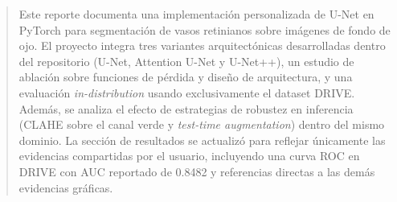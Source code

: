 \begin{abstract}
Este reporte documenta una implementación personalizada de U-Net en PyTorch para segmentación de vasos retinianos sobre imágenes de fondo de ojo. El proyecto integra tres variantes arquitectónicas desarrolladas dentro del repositorio (U-Net, Attention U-Net y U-Net++), un estudio de ablación sobre funciones de pérdida y diseño de arquitectura, y una evaluación \emph{in-distribution} usando exclusivamente el dataset DRIVE. Además, se analiza el efecto de estrategias de robustez en inferencia (CLAHE sobre el canal verde y \emph{test-time augmentation}) dentro del mismo dominio. La sección de resultados se actualizó para reflejar únicamente las evidencias compartidas por el usuario, incluyendo una curva ROC en DRIVE con AUC reportado de 0.8482 y referencias directas a las demás evidencias gráficas.\
\end{abstract}
